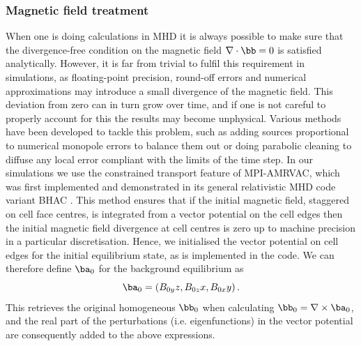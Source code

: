 \subsubsection{Magnetic field treatment}
When one is doing calculations in MHD it is always possible to make sure that the divergence-free condition on the magnetic field $\nabla \cdot \bb = 0$ is satisfied analytically. However, it is far from trivial to fulfil this requirement in simulations, as floating-point precision, round-off errors and numerical approximations may introduce a small divergence of the magnetic field. This deviation from zero can in turn grow over time, and if one is not careful to properly account for this the results may become unphysical. Various methods have been developed to tackle this problem, such as adding sources proportional to numerical monopole errors to balance them out or doing parabolic cleaning to diffuse any local error compliant with the limits of the time step. In our simulations we use the \textsf{constrained transport} feature of MPI-AMRVAC, which was first implemented and demonstrated in its general relativistic MHD code variant BHAC \citep{porth2017_bhac}. This method ensures that if the initial magnetic field, staggered on cell face centres, is integrated from a vector potential on the cell edges then the initial magnetic field divergence at cell centres is zero up to machine precision in a particular discretisation. Hence, we initialised the vector potential on cell edges for the initial equilibrium state, as is implemented in the code. We can therefore define $\ba_0$ for the background equilibrium as
\begin{equation} \label{eq: homo_vectorpotential}
  \ba_0 = \left(B_{0y}z, B_{0z}x, B_{0x}y\right).
\end{equation}
This retrieves the original homogeneous $\bb_0$ when calculating $\bb_0 = \nabla \times \ba_0$, and the real part of the perturbations (i.e. eigenfunctions) in the vector potential are consequently added to the above expressions.

